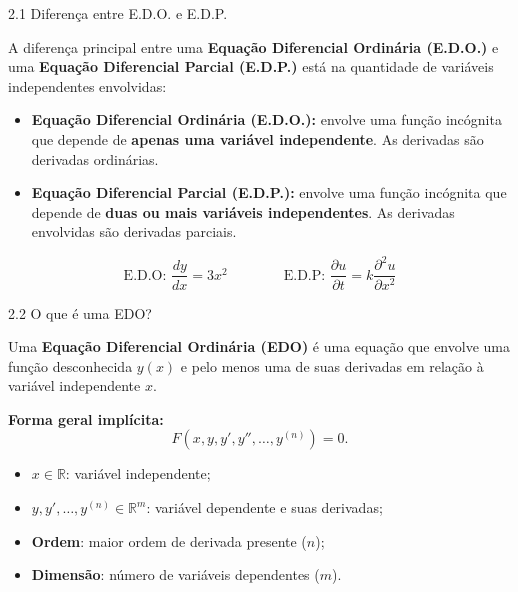 \documentclass[11pt, aspectratio=169, xcolor=table]{beamer}
\begin{document}

\begin{frame}{2.1 Diferença entre E.D.O. e E.D.P.}

A diferença principal entre uma \textbf{Equação Diferencial Ordinária (E.D.O.)} e uma \textbf{Equação Diferencial Parcial (E.D.P.)} está na quantidade de variáveis independentes envolvidas:

\begin{itemize}

    \item \textbf{Equação Diferencial Ordinária (E.D.O.):} 
    envolve uma função incógnita que depende de \textbf{apenas uma variável independente}. 
    As derivadas são derivadas ordinárias.

    \item \textbf{Equação Diferencial Parcial (E.D.P.):}
    envolve uma função incógnita que depende de \textbf{duas ou mais variáveis independentes}. 
    As derivadas envolvidas são derivadas parciais.

\end{itemize}

\[
\text{E.D.O: } \frac{dy}{dx}=3x^2
\qquad\qquad
\text{E.D.P: } \frac{\partial u}{\partial t}=k\frac{\partial^2 u}{\partial x^2}
\]

\end{frame}


\begin{frame}{2.2 O que é uma EDO?}

Uma \textbf{Equação Diferencial Ordinária (EDO)} é uma equação que envolve uma função desconhecida $y(x)$ e pelo menos uma de suas derivadas em relação à variável independente $x$.

\textbf{Forma geral implícita:}
\[
F\!\left(x,y,y',y'',\ldots,y^{(n)}\right)=0.
\]

\begin{itemize}
    \item $x\in\mathbb{R}$: variável independente;
    \item $y,y',\ldots,y^{(n)}\in\mathbb{R}^{m}$: variável dependente e suas derivadas;
    \item \textbf{Ordem}: maior ordem de derivada presente ($n$);
    \item \textbf{Dimensão}: número de variáveis dependentes ($m$).
\end{itemize}

\end{frame}
\end{document}
